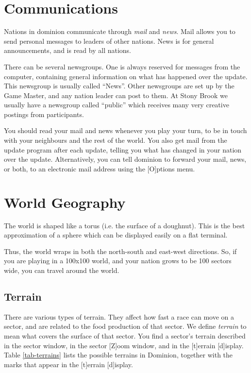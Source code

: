 \section{Communications}
Nations in dominion communicate through {\em mail} and
{\em news}.  Mail allows you to send personal messages to leaders
of other nations.  News is for general announcements, and is read by
all nations.

There can be several newsgroups.  One is always reserved for messages
from the computer, containing general information on what has happened
over the update.  This newsgroup is usually called ``News''.  Other
newsgroups are set up by the Game Master, and any nation leader can
post to them.  At Stony Brook we usually have a newsgroup called
``public'' which receives many very creative postings from
participants.

You should read your mail and news whenever you play your turn, to be
in touch with your neighbours and the rest of the world.  You also get
mail from the update program after each update, telling you what has
changed in your nation over the update.  Alternatively, you can tell
dominion to forward your mail, news, or both, to an electronic mail
address using the [O]ptions menu.

\section{World Geography}
The world is shaped like a torus (i.e. the surface of a doughnut).
This is the best approximation of a sphere which can be displayed
easily on a flat terminal.

Thus, the world wraps in both the north-south and east-west
directions. So, if you are playing in a 100x100 world, and your nation
grows to be 100 sectors wide, you can travel around the world.

\subsection{Terrain}

There are various types of terrain.  They affect how fast a race can
move on a sector, and are related to the food production of that
sector.  We define {\em terrain} to mean what covers the surface of
that sector.  You find a sector's terrain described in the sector
window, in the sector [Z]oom window, and in the [t]errain [d]isplay.
Table \ref{tab-terrains} lists the possible terrains in Dominion,
together with the marks that appear in the [t]errain [d]isplay.

